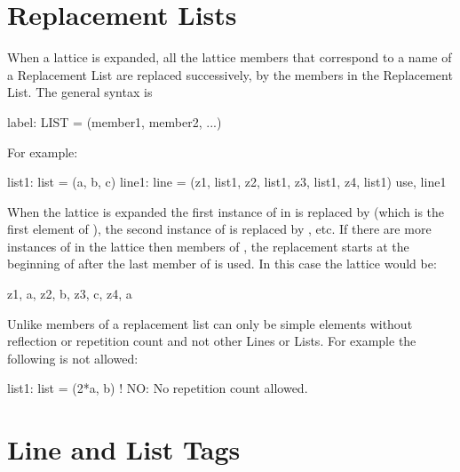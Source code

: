 \section{Replacement Lists}

When a lattice is expanded, all the lattice members that correspond to a 
name of a Replacement List 
are replaced successively, by the members
in the Replacement List. The general syntax is
\begin{example}
  label: LIST = (member1, member2, ...)
\end{example}
For example:
\begin{example}
  list1: list = (a, b, c)
  line1: line = (z1, list1, z2, list1, z3, list1, z4, list1)
  use, line1
\end{example}
When the lattice is expanded the first instance of  in
 is replaced by  (which is the first element of
), the second instance of  is replaced by ,
etc. If there are more instances of  in the lattice then
members of , the replacement starts at the beginning of
 after the last member of  is used. In this case the
lattice would be:
\begin{example}
  z1, a, z2, b, z3, c, z4, a
\end{example}
Unlike \mad members of a replacement list can only be simple elements 
without reflection or repetition count and not other Lines or Lists. 
For example the following is not allowed:
\begin{example}
  list1: list = (2*a, b)  ! NO: No repetition count allowed.
\end{example}

\section{Line and List Tags}
\label{s:tag}

